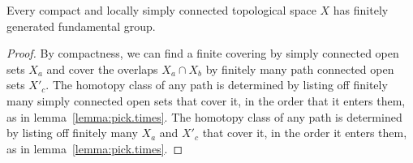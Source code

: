 \begin{corollary}
Every compact and locally simply connected topological space \(X\) has finitely generated fundamental group.
\end{corollary}
\begin{proof}
By compactness, we can find a finite covering by simply connected open sets \(X_a\) and cover the overlaps \(X_a \cap X_b\) by finitely many path connected open sets \(X'_c\).
The homotopy class of any path is determined by listing off finitely many simply connected open sets that cover it, in the order that it enters them, as in lemma~\vref{lemma:pick.times}.
The homotopy class of any path is determined by listing off finitely many \(X_a\) and \(X'_c\) that cover it, in the order it enters them, as in lemma~\vref{lemma:pick.times}.
\end{proof}
